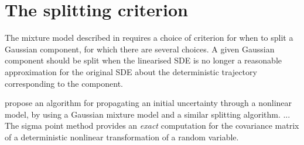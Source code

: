 \section{The splitting criterion}
The mixture model described in  requires a choice of criterion for when to split a Gaussian component, for which there are several choices.
A given Gaussian component should be split when the linearised SDE is no longer a reasonable approximation for the original SDE about the deterministic trajectory corresponding to the component.



\citet{DeMarsEtAl_2013_EntropyBasedApproachUncertainty} propose an algorithm for propagating an initial uncertainty through a nonlinear model, by using a Gaussian mixture model and a similar splitting algorithm.
... The sigma point method provides an \emph{exact} computation for the covariance matrix of a deterministic nonlinear transformation of a random variable.



